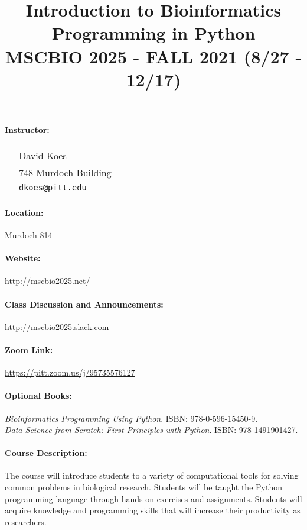 \documentclass[11pt,letterpaper,oneside]{article}
\title{\bf \large \vspace{-.5in} Introduction to Bioinformatics Programming in Python\\MSCBIO 2025 - FALL 2021 (8/27 - 12/17)}
\author{}
\date{}
\begin{document}
\maketitle
\vspace{-.5in}
\thispagestyle{empty}
\vspace{-.25in}

\paragraph*{Instructor:} 
\begin{tabular}[t]{ll}
 & David Koes \\
 & 748 Murdoch Building\\
  & \texttt{dkoes@pitt.edu} \\
\end{tabular}

\paragraph*{Location:} Murdoch 814
\paragraph*{Website:} \url{http://mscbio2025.net/}
\paragraph*{Class Discussion and Announcements:} \url{http://mscbio2025.slack.com}
\paragraph*{Zoom Link:} \url{https://pitt.zoom.us/j/95735576127}
\paragraph*{Optional Books:} {\it Bioinformatics Programming Using Python}.  ISBN: 978-0-596-15450-9. \\
{\it Data Science from Scratch: First Principles with Python}. ISBN: 978-1491901427.

\paragraph*{Course Description:}
The course will introduce students to a variety of computational tools for solving common problems in biological research. Students will be taught the Python programming language through hands on exercises and assignments. Students will acquire knowledge and programming skills that will increase their productivity as researchers.
\end{document}
